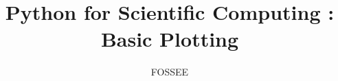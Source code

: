 \documentclass[14pt,compress]{beamer}
\title[Basic Plotting]{Python for Scientific Computing : Basic Plotting}
\author[FOSSEE] {FOSSEE}
\institute[IIT Bombay] {Department of Aerospace Engineering\\IIT Bombay}
\date{}
\begin{document}
\begin{frame}
  \maketitle
\end{frame}



\end{document}
